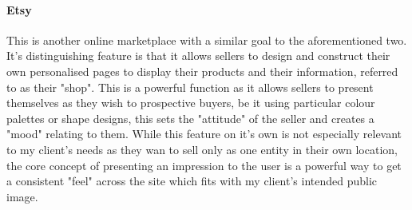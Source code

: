 \documentclass{article}
\begin{document}
    \paragraph{Etsy}
    This is another online marketplace with a similar goal to the aforementioned two.
    It's distinguishing feature is that it allows sellers to design and construct their own personalised pages to display their products and their information, referred to as their "shop".
    This is a powerful function as it allows sellers to present themselves as they wish to prospective buyers, be it using particular colour palettes or shape designs, this sets the "attitude" of the seller and creates a "mood" relating to them.
    While this feature on it's own is not especially relevant to my client's needs as they wan to sell only as one entity in their own location, the core concept of presenting an impression to the user is a powerful way to get a consistent "feel" across the site which fits with my client's intended public image.
\end{document}
